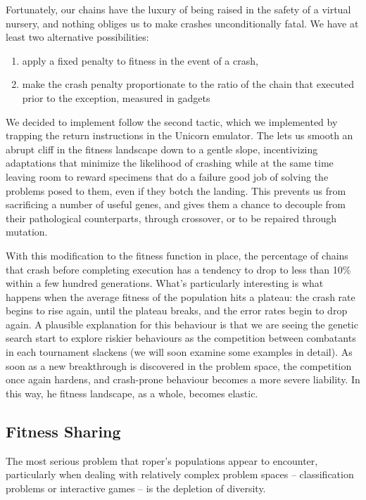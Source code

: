 \documentclass[12pt,glossary]{dalthesis}
\begin{document}
Fortunately, our chains have the luxury of being raised in the safety of a
virtual nursery, and nothing obliges us to make crashes unconditionally fatal.
We have at least two alternative possibilities:

\begin{enumerate}
\item apply a fixed penalty to fitness in the event of a crash,
\item make the crash penalty proportionate to the ratio of
the chain that executed prior to the exception, measured in gadgets
\end{enumerate}

We decided to implement follow the second tactic, which we implemented by
trapping the return instructions in the Unicorn emulator. The lets us smooth an
abrupt cliff in the fitness landscape down to a gentle slope, incentivizing
adaptations that minimize the likelihood of crashing while at the same time
leaving room to reward specimens that do a failure good job of solving the
problems posed to them, even if they botch the landing. This prevents us from
sacrificing a number of useful genes, and gives them a chance to decouple from
their pathological counterparts, through crossover, or to be repaired through
mutation.

With this modification to the fitness function in place, the percentage of
chains that crash before completing execution has a tendency to drop to less
than 10\% within a few hundred generations.  What's
particularly interesting is what happens when the average fitness of the
population hits a plateau: the crash rate begins to rise again, until the
plateau breaks, and the error rates begin to drop again. A plausible explanation
for this behaviour is that we are seeing the genetic search start to explore
riskier behaviours as the competition between combatants in each tournament
slackens (we will soon examine some examples in detail). As soon as a new
breakthrough is discovered in the problem space, the competition once again
hardens, and crash-prone behaviour becomes a more severe liability. In this way,
he fitness landscape, as a whole, becomes elastic.

\subsection{Fitness Sharing}
\label{sec:org9de548d}
\label{org5debb5e}

The most serious problem that \gls{roper}'s populations appear to encounter, particularly
when dealing with relatively complex problem spaces -- classification problems or
interactive games -- is the depletion of diversity. 
\end{document}
